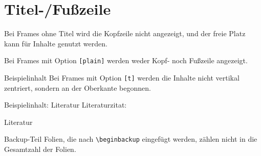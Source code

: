 \documentclass{sdqbeamer}
\begin{document}
\section{Titel-/Fußzeile}
\begin{frame}
        Bei Frames ohne Titel wird die Kopfzeile nicht angezeigt, und  
    der freie Platz kann für Inhalte genutzt werden.
\end{frame}

\begin{frame}[plain]
    Bei Frames mit Option \texttt{[plain]} werden weder Kopf- noch Fußzeile angezeigt.
\end{frame}

\begin{frame}[t]{Beispielinhalt}
    Bei Frames mit Option \texttt{[t]} werden die Inhalte nicht vertikal zentriert, sondern an der Oberkante begonnen.
\end{frame}


\begin{frame}{Beispielinhalt: Literatur}
    Literaturzitat: \cite{klare2021jss}
\end{frame}

\appendix
\beginbackup

\begin{frame}{Literatur}
\begin{exampleblock}{Backup-Teil}
    Folien, die nach \texttt{\textbackslash beginbackup} eingefügt werden, zählen nicht in die Gesamtzahl der Folien.
\end{exampleblock}

\printbibliography
\end{frame}
\end{document}
